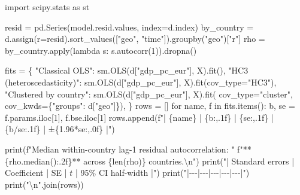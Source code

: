 \documentclass[
  letterpaper,
  10pt,
  twoside,
  openright,
  numbers=noenddot,
  chapterprefix=true]{scrbook}
\newenvironment{Shaded}{}{}
\newcommand{\BuiltInTok}[1]{\textcolor[rgb]{0.84,0.23,0.29}{#1}}
\newcommand{\CharTok}[1]{\textcolor[rgb]{0.01,0.18,0.38}{#1}}
\newcommand{\ControlFlowTok}[1]{\textcolor[rgb]{0.84,0.23,0.29}{#1}}
\newcommand{\DecValTok}[1]{\textcolor[rgb]{0.00,0.36,0.77}{#1}}
\newcommand{\FloatTok}[1]{\textcolor[rgb]{0.00,0.36,0.77}{#1}}
\newcommand{\ImportTok}[1]{\textcolor[rgb]{0.01,0.18,0.38}{#1}}
\newcommand{\KeywordTok}[1]{\textcolor[rgb]{0.84,0.23,0.29}{#1}}
\newcommand{\NormalTok}[1]{\textcolor[rgb]{0.14,0.16,0.18}{#1}}
\newcommand{\OperatorTok}[1]{\textcolor[rgb]{0.14,0.16,0.18}{#1}}
\newcommand{\SpecialCharTok}[1]{\textcolor[rgb]{0.00,0.36,0.77}{#1}}
\newcommand{\SpecialStringTok}[1]{\textcolor[rgb]{0.01,0.18,0.38}{#1}}
\newcommand{\StringTok}[1]{\textcolor[rgb]{0.01,0.18,0.38}{#1}}
\begin{document}
\begin{Shaded}
\begin{Highlighting}[]
\ImportTok{import}\NormalTok{ scipy.stats }\ImportTok{as}\NormalTok{ st}

\NormalTok{resid }\OperatorTok{=}\NormalTok{ pd.Series(model.resid.values, index}\OperatorTok{=}\NormalTok{d.index)}
\NormalTok{by\_country }\OperatorTok{=}\NormalTok{ d.assign(r}\OperatorTok{=}\NormalTok{resid).sort\_values([}\StringTok{"geo"}\NormalTok{, }\StringTok{"time"}\NormalTok{]).groupby(}\StringTok{"geo"}\NormalTok{)[}\StringTok{"r"}\NormalTok{]}
\NormalTok{rho }\OperatorTok{=}\NormalTok{ by\_country.}\BuiltInTok{apply}\NormalTok{(}\KeywordTok{lambda}\NormalTok{ s: s.autocorr(}\DecValTok{1}\NormalTok{)).dropna()}

\NormalTok{fits }\OperatorTok{=}\NormalTok{ \{}
    \StringTok{"Classical OLS"}\NormalTok{: sm.OLS(d[}\StringTok{"gdp\_pc\_eur"}\NormalTok{], X).fit(),}
    \StringTok{"HC3 (heteroscedasticity)"}\NormalTok{: sm.OLS(d[}\StringTok{"gdp\_pc\_eur"}\NormalTok{], X).fit(cov\_type}\OperatorTok{=}\StringTok{"HC3"}\NormalTok{),}
    \StringTok{"Clustered by country"}\NormalTok{: sm.OLS(d[}\StringTok{"gdp\_pc\_eur"}\NormalTok{], X).fit(}
\NormalTok{        cov\_type}\OperatorTok{=}\StringTok{"cluster"}\NormalTok{, cov\_kwds}\OperatorTok{=}\NormalTok{\{}\StringTok{"groups"}\NormalTok{: d[}\StringTok{"geo"}\NormalTok{]\}),}
\NormalTok{\}}
\NormalTok{rows }\OperatorTok{=}\NormalTok{ []}
\ControlFlowTok{for}\NormalTok{ name, f }\KeywordTok{in}\NormalTok{ fits.items():}
\NormalTok{    b, se }\OperatorTok{=}\NormalTok{ f.params.iloc[}\DecValTok{1}\NormalTok{], f.bse.iloc[}\DecValTok{1}\NormalTok{]}
\NormalTok{    rows.append(}\SpecialStringTok{f"| }\SpecialCharTok{\{}\NormalTok{name}\SpecialCharTok{\}}\SpecialStringTok{ | }\SpecialCharTok{\{}\NormalTok{b}\SpecialCharTok{:,.1f\}}\SpecialStringTok{ | }\SpecialCharTok{\{}\NormalTok{se}\SpecialCharTok{:,.1f\}}\SpecialStringTok{ | }\SpecialCharTok{\{}\NormalTok{b}\OperatorTok{/}\NormalTok{se}\SpecialCharTok{:.1f\}}\SpecialStringTok{ | ±}\SpecialCharTok{\{}\FloatTok{1.96}\OperatorTok{*}\NormalTok{se}\SpecialCharTok{:,.0f\}}\SpecialStringTok{ |"}\NormalTok{)}

\BuiltInTok{print}\NormalTok{(}\SpecialStringTok{f"Median within{-}country lag{-}1 residual autocorrelation: "}
      \SpecialStringTok{f"**}\SpecialCharTok{\{}\NormalTok{rho}\SpecialCharTok{.}\NormalTok{median()}\SpecialCharTok{:.2f\}}\SpecialStringTok{** across }\SpecialCharTok{\{}\BuiltInTok{len}\NormalTok{(rho)}\SpecialCharTok{\}}\SpecialStringTok{ countries.}\CharTok{\textbackslash{}n}\SpecialStringTok{"}\NormalTok{)}
\BuiltInTok{print}\NormalTok{(}\StringTok{"| Standard errors | Coefficient | SE | $t$ | 95\% CI half{-}width |"}\NormalTok{)}
\BuiltInTok{print}\NormalTok{(}\StringTok{"|{-}{-}{-}|{-}{-}{-}|{-}{-}{-}|{-}{-}{-}|{-}{-}{-}|"}\NormalTok{)}
\BuiltInTok{print}\NormalTok{(}\StringTok{"}\CharTok{\textbackslash{}n}\StringTok{"}\NormalTok{.join(rows))}
\end{Highlighting}
\end{Shaded}
\end{document}
